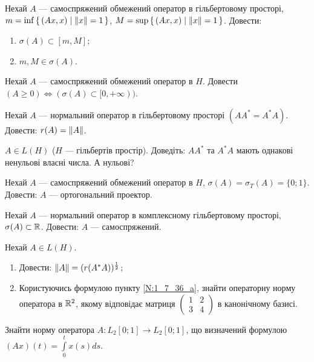 
\begin{exercise}
    Нехай $A$ --- самоспряжений обмежений оператор в гільбертовому просторі,
    $m = \inf\set{\left(Ax, x\right) \mid \left\lVert x\right\rVert=1}$,
    $M = \sup\set{\left(Ax, x\right) \mid \left\lVert x\right\rVert=1}$.
    Довести:
    \begin{enumerate}
        \item $\sigma(A) \subset [m,M]$;
        \item $m,M \in \sigma(A)$.
    \end{enumerate}
\end{exercise}

\begin{exercise}
    Нехай $A$ --- самоспряжений обмежений оператор в $H$. Довести $(A \geq 0)
    \Leftrightarrow (\sigma(A) \subset [0,+\infty))$.
\end{exercise}

\begin{exercise}
    Нехай $A$ --- нормальний оператор в гільбертовому просторі $(AA^* = A^* A)$.
    Довести: $r(A) = \left\lVert A\right\rVert$.
\end{exercise}

\begin{exercise}
    $A \in L(H)$ ($H$ --- гільбертів простір). Доведіть: $AA^*$ та $A^* A$ мають
    однакові ненульові власні числа. А нульові?
\end{exercise}

\begin{exercise}
    Нехай $A$ --- самоспряжений обмежений оператор в $H$, $\sigma(A) = \sigma_T(A)
    = \{0;1\}$. Довести: $A$ --- ортогональний проектор.
\end{exercise}

\begin{exercise}
    Нехай $A$ --- нормальний оператор в комплексному гільбертовому просторі,
    $\sigma(A) \subset \mathbb{R}$. Довести: $A$ --- самоспряжений.
\end{exercise}

\begin{exercise}
    Нехай $A \in L(H)$.
    \begin{enumerate}
        \item\label{N:1_7_36_a} Довести: $\left\lVert A\right\rVert = (r(A^*A))^{\frac{1}{2}}$;
        \item Користуючись формулою пункту \ref{N:1_7_36_a},  знайти операторну
        норму оператора в $\mathbb{R}^2$, якому відповідає матриця $\begin{pmatrix}
        1 & 2 \\ 3 & 4 \end{pmatrix}$ в канонічному базисі.
    \end{enumerate}
\end{exercise}

\begin{exercise}
    Знайти норму оператора $A: L_2[0;1] \to L_2[0;1]$, що визначений формулою
    $(Ax)(t) = \int\limits^t_0 x(s)ds$.
\end{exercise}